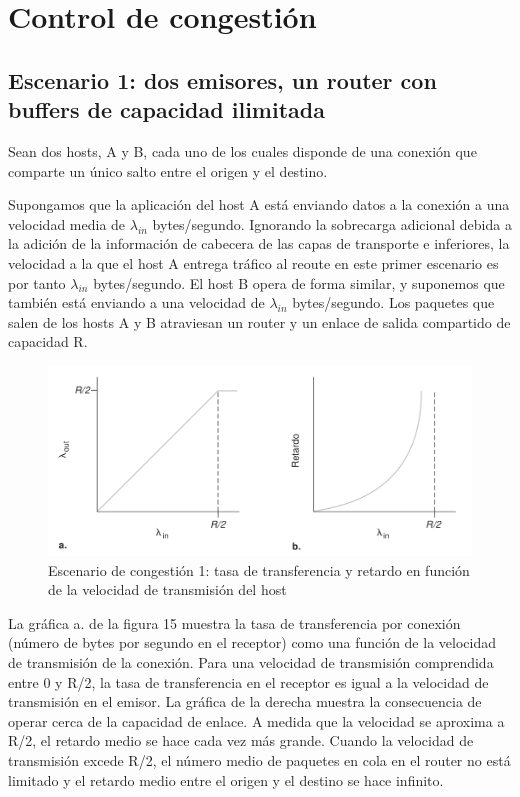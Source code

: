 \documentclass[a4paper,11pt]{article}
\begin{document}
\section{Control de congestión}
\subsection{Escenario 1: dos emisores, un router con buffers de capacidad ilimitada}
Sean dos hosts, A y B, cada uno de los cuales disponde de una conexión que comparte un único salto entre el origen y el destino.

Supongamos que la aplicación del host A está enviando datos a la conexión a una velocidad media de $\lambda_{in}$ bytes/segundo. Ignorando la sobrecarga adicional debida a la adición de la información de cabecera de las capas de transporte e inferiores, la velocidad a la que el host A entrega tráfico al reoute en este primer escenario es por tanto $\lambda_{in}$ bytes/segundo. El host B opera de forma similar, y suponemos que también está enviando a una velocidad de $\lambda_{in}$ bytes/segundo. Los paquetes que salen de los hosts A y B atraviesan un router y un enlace de salida compartido de capacidad R. \\

\begin{figure}[h]
\centering
\caption{Escenario de congestión 1: tasa de transferencia y retardo en función de la velocidad de transmisión del host}
\includegraphics[scale=1,width=1\textwidth]{escenario_1.png}
\end{figure}

La gráfica a. de la figura 15 muestra la tasa de transferencia por conexión (número de bytes por segundo en el receptor) como una función de la velocidad de transmisión de la conexión. Para una velocidad de transmisión comprendida entre 0 y R/2, la tasa de transferencia en el receptor es igual a la velocidad de transmisión en el emisor. La gráfica de la derecha muestra la consecuencia de operar cerca de la capacidad de enlace. A medida que la velocidad se aproxima a R/2, el retardo medio se hace cada vez más grande. Cuando la velocidad de transmisión excede R/2, el número medio de paquetes en cola en el router no está limitado y el retardo medio entre el origen y el destino se hace infinito.
\end{document}
